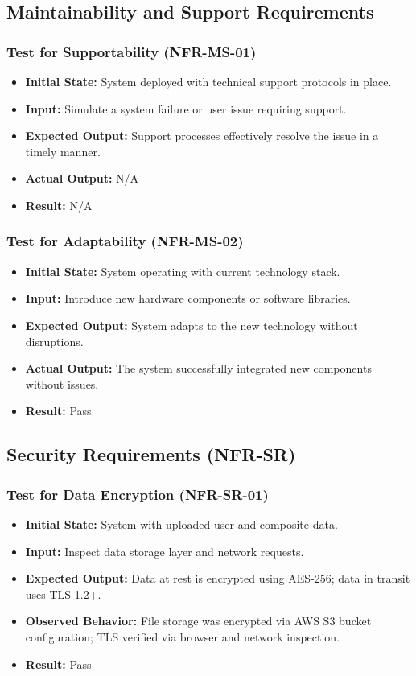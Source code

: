 \documentclass[12pt, titlepage]{article}
\begin{document}
\subsection{Maintainability and Support Requirements}

\subsubsection{Test for Supportability (NFR-MS-01)}
\begin{itemize}
    \item \textbf{Initial State: }System deployed with technical support protocols in place.
    \item \textbf{Input: }Simulate a system failure or user issue requiring support.
    \item \textbf{Expected Output: }Support processes effectively resolve the issue in a timely manner.
    \item \textbf{Actual Output: }N/A
    \item \textbf{Result: }N/A
\end{itemize}

\subsubsection{Test for Adaptability (NFR-MS-02)}
\begin{itemize}
    \item \textbf{Initial State: }System operating with current technology stack.
    \item \textbf{Input: }Introduce new hardware components or software libraries.
    \item \textbf{Expected Output: }System adapts to the new technology without disruptions.
    \item \textbf{Actual Output: }The system successfully integrated new components without issues.
    \item \textbf{Result: }Pass
\end{itemize}
\subsection{Security Requirements (NFR-SR)}

\subsubsection{Test for Data Encryption (NFR-SR-01)}
\begin{itemize}
    \item \textbf{Initial State:} System with uploaded user and composite data.
    \item \textbf{Input:} Inspect data storage layer and network requests.
    \item \textbf{Expected Output:} Data at rest is encrypted using AES-256; data in transit uses TLS 1.2+.
    \item \textbf{Observed Behavior:} File storage was encrypted via AWS S3 bucket configuration; TLS verified via browser and network inspection.
    \item \textbf{Result:} Pass
\end{itemize}
\end{document}
